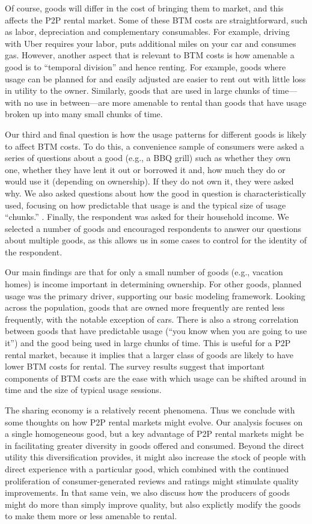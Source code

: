 \documentclass[11pt]{article}
\begin{document}
Of course, goods will differ in the cost of bringing them to market, and this affects the P2P rental market. 
Some of these BTM costs are straightforward, such as labor, depreciation and complementary consumables.
For example, driving with Uber requires your labor, puts additional miles on your car and consumes gas.
However, another aspect that is relevant to BTM costs is how amenable a good is to ``temporal division'' and hence renting.
For example, goods where usage can be planned for and easily adjusted are easier to rent out with little loss in utility to the owner. 
Similarly, goods that are used in large chunks of time---with no use in between---are more amenable to rental than goods that have usage broken up into many small chunks of time.

Our third and final question is how the usage patterns for different goods is likely to affect BTM costs.
To do this, a convenience sample of consumers were asked a series of questions about a good (e.g., a BBQ grill) such as whether they own one, whether they have lent it out or borrowed it and, how much they do or would use it (depending on ownership). 
If they do not own it, they were asked why. 
We also asked questions about how the good in question is characteristically used, focusing on how predictable that usage is and the typical size of usage ``chunks.'' . 
Finally, the respondent was asked for their household income.  
We selected a number of goods and encouraged respondents to answer our questions about multiple goods, as this allows us in some cases to control for the identity of the respondent. 

Our main findings are that for only a small number of goods (e.g., vacation homes) is income important in determining ownership. 
For other goods, planned usage was the primary driver, supporting our basic modeling framework.  
Looking across the population, goods that are owned more frequently are rented less frequently, with the notable exception of cars.
There is also a strong correlation between goods that have predictable usage (``you know when you are going to use it'') and the good being used in large chunks of time.
This is useful for a P2P rental market, because it implies that a larger class of goods are likely to have lower BTM costs for rental.  
The survey results suggest that important components of BTM costs are the ease with which usage can be shifted around in time and the size of typical usage sessions.

The sharing economy is a relatively recent phenomena.
Thus we conclude with some thoughts on how P2P rental markets might evolve.
Our analysis focuses on a single homogeneous good, but a key advantage of P2P rental markets might be in facilitating greater diversity in goods offered and consumed. 
Beyond the direct utility this diversification provides, it might also increase the stock of people with direct experience with a particular good, which combined with the continued proliferation of consumer-generated reviews and ratings might stimulate quality improvements. 
In that same vein, we also discuss how the producers of goods might do more than simply improve quality, but also explictly modify the goods to make them more or less amenable to rental.
\end{document}
